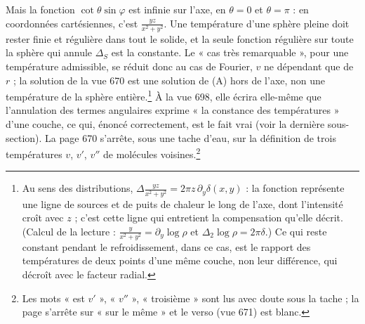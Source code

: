 \documentclass[11pt,a4paper]{article}
\begin{document}
Mais la fonction $\cot\theta\sin\varphi$ est infinie sur l'axe, en $\theta =
0$ et $\theta = \pi$ : en coordonnées cartésiennes, c'est $\frac{yz}{x^2 +
y^2}$. Une température d'une sphère pleine doit rester finie et régulière dans
tout le solide, et la seule fonction régulière sur toute la sphère qui annule
$\Delta_S$ est la constante. Le « cas très remarquable », pour une température
admissible, se réduit donc au cas de Fourier, $v$ ne dépendant que de $r$ ; la
solution de la vue 670 est une solution de (A) hors de l'axe, non une
température de la sphère entière.\footnote{Au sens des distributions,
$\Delta\frac{yz}{x^2+y^2} = 2\pi z\,\partial_y\delta(x,y)$ : la fonction
représente une ligne de sources et de puits de chaleur le long de l'axe, dont
l'intensité croît avec $z$ ; c'est cette ligne qui entretient la compensation
qu'elle décrit. (Calcul de la lecture : $\frac{y}{x^2+y^2} = \partial_y\log
\rho$ et $\Delta_2\log\rho = 2\pi\delta$.) Ce qui reste constant pendant le
refroidissement, dans ce cas, est le rapport des températures de deux points
d'une même couche, non leur différence, qui décroît avec le facteur radial.} À
la vue 698, elle écrira elle-même que l'annulation des termes angulaires
exprime « la constance des températures » d'une couche, ce qui, énoncé
correctement, est le fait vrai (voir la dernière sous-section). La page 670
s'arrête, sous une tache d'eau, sur la définition de trois températures $v$,
$v'$, $v''$ de molécules voisines.\footnote{Les mots « est $v'$ », « $v''$ »,
« troisième » sont lus avec doute sous la tache ; la page s'arrête sur « sur
le même » et le verso (vue 671) est blanc.}
\end{document}
